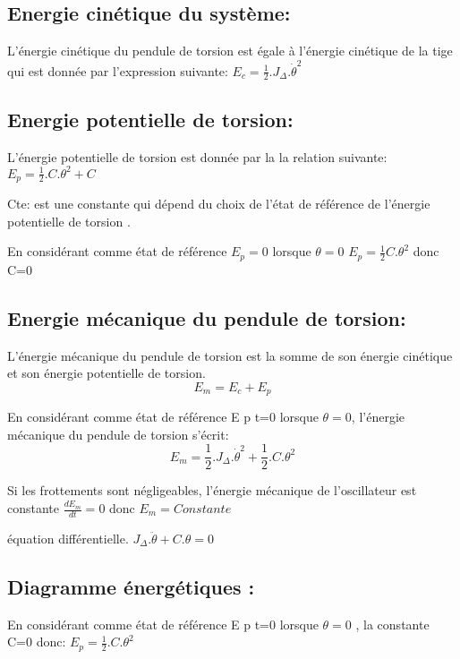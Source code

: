 \documentclass[12pt]{article}
\begin{document}
\subsection{Energie cinétique du système: }
L'énergie cinétique du pendule de torsion est égale à l'énergie cinétique de la tige qui est donnée par l'expression suivante:
$E_c = \frac{1}{2}.J_\Delta.\dot{\theta}^2$

\subsection{Energie potentielle de torsion:}

L'énergie potentielle de torsion est donnée par la la relation suivante: $E_p = \frac{1}{2}.C.\theta^2 + C$

Cte: est une constante qui dépend du choix de l’état de référence de l’énergie potentielle de torsion .

En considérant comme état de référence $E_p = 0$ lorsque $\theta = 0$ $E_p = \frac{1}{2}C.\theta^2$ donc C=0

\subsection{Energie mécanique du pendule de torsion: }

L'énergie mécanique du pendule de torsion est la somme de son énergie cinétique et son énergie potentielle de torsion. $$E_m = E_c + E_p$$

En considérant comme état de référence E p t=0 lorsque $\theta = 0$, l'énergie mécanique du pendule de torsion s'écrit: 
$$E_m = \frac{1}{2}.J_\Delta.\dot{\theta}^2 + \frac{1}{2}.C.\theta^2$$

Si les frottements sont négligeables, l'énergie mécanique de l'oscillateur est constante 
$\frac{dE_m}{dt} = 0$ donc $E_m = Constante$

équation différentielle. $J_\Delta.\ddot{\theta} + C.\theta = 0$

\subsection{Diagramme énergétiques :}
En considérant comme état de référence E p t=0 lorsque $\theta = 0$ , la constante C=0 donc: $E_p = \frac{1}{2}.C.\theta^2$
\end{document}
